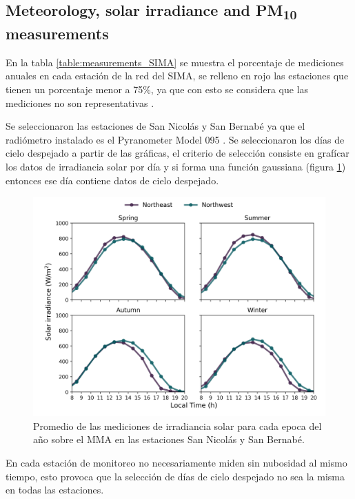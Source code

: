 \subsection{Meteorology, solar irradiance and PM\textsubscript{10} measurements}
En la tabla \ref{table:measurements_SIMA} se muestra el porcentaje de mediciones anuales en cada estación de la red del SIMA, se relleno en rojo las estaciones que tienen un porcentaje menor a 75\%, ya que con esto se considera que las mediciones no son representativas \cite{molina2019}.

Se seleccionaron las estaciones de San Nicolás y San Bernabé ya que el radiómetro instalado es el Pyranometer Model 095 \cite{MetOne}. Se seleccionaron los días de cielo despejado a partir de las gráficas, el criterio de selección consiste en grafícar los datos de irradiancia solar por día y si forma una función gaussiana (figura \ref{fig:clear_days}) entonces ese día contiene datos de cielo despejado.
\begin{figure}[H]
    \centering
    \includegraphics[scale=0.5]{images/Clear_days.png}
    \caption{Promedio de las mediciones de irradiancia solar para cada epoca del año sobre el MMA en las estaciones San Nicolás y San Bernabé.}
    \label{fig:clear_days}
\end{figure}
En cada estación de monitoreo no necesariamente miden sin nubosidad al mismo tiempo, esto provoca que la selección de días de cielo despejado no sea la misma en todas las estaciones.